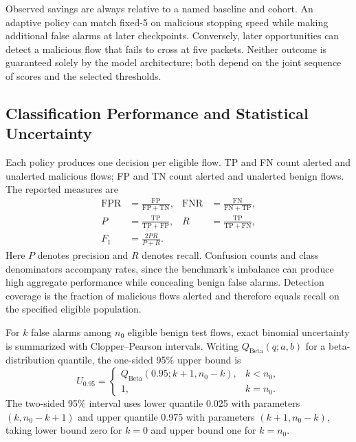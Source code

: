 \documentclass[conference]{IEEEtran}
\begin{document}
Observed savings are always relative to a named baseline and cohort. An adaptive policy can match fixed-5 on malicious stopping speed while making additional false alarms at later checkpoints. Conversely, later opportunities can detect a malicious flow that fails to cross at five packets. Neither outcome is guaranteed solely by the model architecture; both depend on the joint sequence of scores and the selected thresholds.

\subsection{Classification Performance and Statistical Uncertainty}
Each policy produces one decision per eligible flow. TP and FN count alerted and unalerted malicious flows; FP and TN count alerted and unalerted benign flows. The reported measures are
\begin{equation}
\begin{aligned}
\mathrm{FPR}&=\frac{\mathrm{FP}}{\mathrm{FP}+\mathrm{TN}},
&\mathrm{FNR}&=\frac{\mathrm{FN}}{\mathrm{FN}+\mathrm{TP}},\\
P&=\frac{\mathrm{TP}}{\mathrm{TP}+\mathrm{FP}},
&R&=\frac{\mathrm{TP}}{\mathrm{TP}+\mathrm{FN}},\\
F_1&=\frac{2PR}{P+R}.
\end{aligned}
\label{eq:classification_metrics}
\end{equation}
Here $P$ denotes precision and $R$ denotes recall. Confusion counts and class denominators accompany rates, since the benchmark's imbalance can produce high aggregate performance while concealing benign false alarms. Detection coverage is the fraction of malicious flows alerted and therefore equals recall on the specified eligible population.

For $k$ false alarms among $n_0$ eligible benign test flows, exact binomial uncertainty is summarized with Clopper--Pearson intervals. Writing $Q_{\mathrm{Beta}}(q;a,b)$ for a beta-distribution quantile, the one-sided 95\% upper bound is
\begin{equation}
U_{0.95}=
\begin{cases}
Q_{\mathrm{Beta}}(0.95;k+1,n_0-k),&k<n_0,\\
1,&k=n_0.
\end{cases}
\label{eq:fpr_upper}
\end{equation}
The two-sided 95\% interval uses lower quantile 0.025 with parameters $(k,n_0-k+1)$ and upper quantile 0.975 with parameters $(k+1,n_0-k)$, taking lower bound zero for $k=0$ and upper bound one for $k=n_0$.
\end{document}
